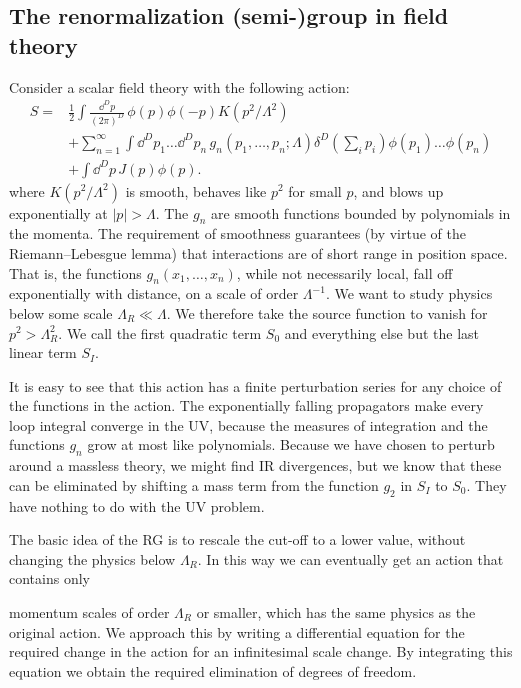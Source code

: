 \subsection{The renormalization (semi-)group in field theory}

Consider a scalar field theory with the following action:
\[
\begin{aligned}
  S={}&\frac12\int\frac{\dd^D p}{(2\pi)^D}\,
  \phi(p)\phi(-p)K(p^2/\Lambda^2)\\
  &+\sum_{n=1}^{\infty}\int\dd^D p_1\ldots\dd^D p_n\,
  g_n(p_1,\ldots,p_n;\Lambda)\delta^D\left(\sum_i p_i\right)
  \phi(p_1)\ldots\phi(p_n)\\
  &+\int\dd^D p\,J(p)\phi(p) .
\end{aligned}
\]
where $K(p^2/\Lambda^2)$ is smooth, behaves like $p^2$ for small $p$, and
blows up exponentially at $|p|>\Lambda$. The $g_n$ are smooth functions
bounded by polynomials in the momenta. The requirement of smoothness
guarantees (by virtue of the Riemann--Lebesgue lemma) that interactions are of
short range in position space. That is, the functions
$g_n(x_1,\ldots,x_n)$, while not necessarily local, fall off exponentially
with distance, on a scale of order $\Lambda^{-1}$. We want to study physics
below some scale $\Lambda_R\ll\Lambda$. We therefore take the source
function to vanish for $p^2>\Lambda_R^2$. We call the first quadratic term
$S_0$ and everything else but the last linear term $S_I$.

It is easy to see that this action has a finite perturbation series for any
choice of the functions in the action. The exponentially falling propagators
make every loop integral converge in the UV, because the measures of
integration and the functions $g_n$ grow at most like polynomials. Because we
have chosen to perturb around a massless theory, we might find IR divergences,
but we know that these can be eliminated by shifting a mass term from the
function $g_2$ in $S_I$ to $S_0$. They have nothing to do with the UV problem.


The basic idea of the RG is to rescale the cut-off to a lower value, without
changing the physics below $\Lambda_R$. In this way we can eventually get an
action that contains only

momentum scales of order $\Lambda_R$ or smaller, which has the same physics as
the original action. We approach this by writing a differential equation for
the required change in the action for an infinitesimal scale change. By
integrating this equation we obtain the required elimination of degrees of
freedom.

